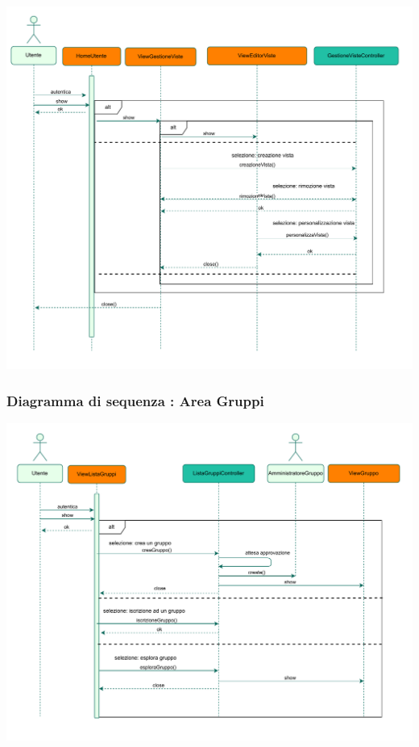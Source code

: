 \begin{adjustwidth}{-2.5cm}{0cm}
\includegraphics[scale=0.8]{interazione/Package-Interazione-AreaPersonale.drawio.pdf}
\end{adjustwidth}


\subsubsection*{Diagramma di sequenza : Area Gruppi}
\vspace{0.5cm}

\begin{adjustwidth}{-2.5cm}{0cm}
\includegraphics[scale=0.8]{interazione/Package-Interazione-AreaGruppi.drawio.pdf}
\end{adjustwidth}
